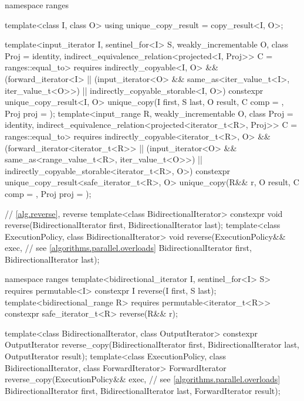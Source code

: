 \begin{codeblock}
{  namespace ranges {
    template<class I, class O>
    using unique_copy_result = copy_result<I, O>;

    template<input_iterator I, sentinel_for<I> S, weakly_incrementable O, class Proj = identity,
             indirect_equivalence_relation<projected<I, Proj>> C = ranges::equal_to>
      requires indirectly_copyable<I, O> &&
               (forward_iterator<I> ||
                (input_iterator<O> && same_as<iter_value_t<I>, iter_value_t<O>>) ||
                indirectly_copyable_storable<I, O>)
      constexpr unique_copy_result<I, O>
        unique_copy(I first, S last, O result, C comp = {}, Proj proj = {});
    template<input_range R, weakly_incrementable O, class Proj = identity,
             indirect_equivalence_relation<projected<iterator_t<R>, Proj>> C = ranges::equal_to>
      requires indirectly_copyable<iterator_t<R>, O> &&
               (forward_iterator<iterator_t<R>> ||
                (input_iterator<O> && same_as<range_value_t<R>, iter_value_t<O>>) ||
                indirectly_copyable_storable<iterator_t<R>, O>)
      constexpr unique_copy_result<safe_iterator_t<R>, O>
        unique_copy(R&& r, O result, C comp = {}, Proj proj = {});
  }

  // \ref{alg.reverse}, reverse
  template<class BidirectionalIterator>
    constexpr void reverse(BidirectionalIterator first, BidirectionalIterator last);
  template<class ExecutionPolicy, class BidirectionalIterator>
    void reverse(ExecutionPolicy&& exec,                        // see \ref{algorithms.parallel.overloads}
                 BidirectionalIterator first, BidirectionalIterator last);

  namespace ranges {
    template<bidirectional_iterator I, sentinel_for<I> S>
      requires permutable<I>
      constexpr I reverse(I first, S last);
    template<bidirectional_range R>
      requires permutable<iterator_t<R>>
      constexpr safe_iterator_t<R> reverse(R&& r);
  }

  template<class BidirectionalIterator, class OutputIterator>
    constexpr OutputIterator
      reverse_copy(BidirectionalIterator first, BidirectionalIterator last,
                   OutputIterator result);
  template<class ExecutionPolicy, class BidirectionalIterator, class ForwardIterator>
    ForwardIterator
      reverse_copy(ExecutionPolicy&& exec,                      // see \ref{algorithms.parallel.overloads}
                   BidirectionalIterator first, BidirectionalIterator last,
                   ForwardIterator result);

}
\end{codeblock}
